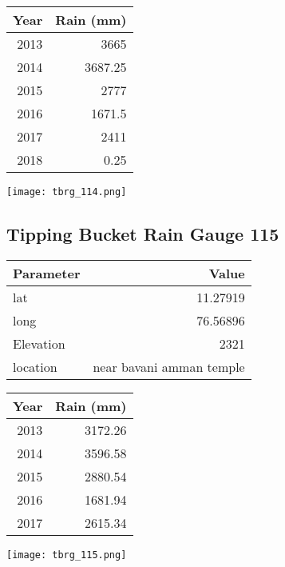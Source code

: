 \documentclass[a4paper]{article}
\begin{document}
\begin{center}
\begin{tabular}{rr}
Year & Rain (mm)\\
\hline
2013 & 3665\\
2014 & 3687.25\\
2015 & 2777\\
2016 & 1671.5\\
2017 & 2411\\
2018 & 0.25\\
\end{tabular}
\end{center}

\begin{center}
\texttt{[image: tbrg\_114.png]}
\end{center}

\newpage

\subsection*{Tipping Bucket Rain Gauge 115}
\label{sec:org77ec842}

\begin{center}
\begin{tabular}{lr}
Parameter & Value\\
\hline
lat & 11.27919\\
long & 76.56896\\
Elevation & 2321\\
location & near bavani amman temple\\
\end{tabular}
\end{center}

\begin{center}
\begin{tabular}{rr}
Year & Rain (mm)\\
\hline
2013 & 3172.26\\
2014 & 3596.58\\
2015 & 2880.54\\
2016 & 1681.94\\
2017 & 2615.34\\
\end{tabular}
\end{center}

\begin{center}
\texttt{[image: tbrg\_115.png]}
\end{center}

\newpage
\end{document}
